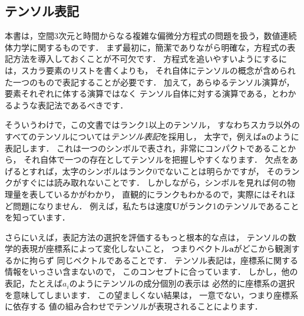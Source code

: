 

\subsection{テンソル表記}
\label{ssec:1.2.1}
本書は，空間3次元と時間からなる複雑な偏微分方程式の問題を扱う，数値連続体力学に関するものです．
まず最初に，簡潔でありながら明確な，方程式の表記方法を導入しておくことが不可欠です．
方程式を追いやすいようにするには，スカラ要素のリストを書くよりも，
それ自体にテンソルの概念が含められた一つのもので表記することが必要です．
加えて，あらゆるテンソル演算が，要素それぞれに体する演算ではなく
テンソル自体に対する演算である，とわかるような表記法であるべきです．

そういうわけで，この文書ではランク1以上のテンソル，
すなわちスカラ以外のすべてのテンソルについては\emph{テンソル表記}を採用し，
太字で，例えば$\bm{a}$のように表記します．
これは一つのシンボルで表され，非常にコンパクトであることから，
それ自体で一つの存在としてテンソルを把握しやすくなります．
欠点をあげるとすれば，太字のシンボルはランク0でないことは明らかですが，
そのランクがすぐには読み取れないことです．
しかしながら，シンボルを見れば何の物理量を表しているかがわかり，
直観的にランクもわかるので，実際にはそれほど問題になりません．
例えば，私たちは速度$\bm{U}$がランク1のテンソルであることを知っています．

さらにいえば，表記方法の選択を評価するもっと根本的な点は，
テンソルの数学的表現が座標系によって変化しないこと，
つまりベクトル$\bm{a}$がどこから観測するかに拘らず
同じベクトルであることです．
テンソル表記は，座標系に関する情報をいっさい含まないので，
このコンセプトに合っています．
しかし，他の表記，たとえば$a_{i}$のようにテンソルの成分個別の表示は
必然的に座標系の選択を意味してしまいます．
この望ましくない結果は，
一意でない，つまり座標系に依存する
値の組み合わせでテンソルが表現されることによります．

